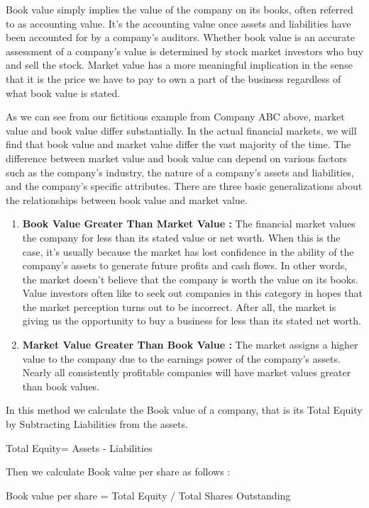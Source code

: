 	Book value simply implies the value of the company on its books, often referred to as accounting value. It's the accounting value once assets and liabilities have been accounted for by a company's auditors. Whether book value is an accurate assessment of a company's value is determined by stock market investors who buy and sell the stock. Market value has a more meaningful implication in the sense that it is the price we have to pay to own a part of the business regardless of what book value is stated.
	
	As we can see from our fictitious example from Company ABC above, market value and book value differ substantially. In the actual financial markets, we will find that book value and market value differ the vast majority of the time. The difference between market value and book value can depend on various factors such as the company's industry, the nature of a company's assets and liabilities, and the company's specific attributes. There are three basic generalizations about the relationships between book value and market value.
\begin{enumerate}
	\item \textbf{Book Value Greater Than Market Value :}  The financial market values the company for less than its stated value or net worth. When this is the case, it's usually because the market has lost confidence in the ability of the company's assets to generate future profits and cash flows. In other words, the market doesn't believe that the company is worth the value on its books. Value investors often like to seek out companies in this category in hopes that the market perception turns out to be incorrect. After all, the market is giving us the opportunity to buy a business for less than its stated net worth.

	\item \textbf{Market Value Greater Than Book Value :}  The market assigns a higher value to the company due to the earnings power of the company's assets. Nearly all consistently profitable companies will have market values greater than book values.
\end{enumerate}
In this method we calculate the Book value of a company, that is its Total Equity by Subtracting Liabilities from the assets.

Total Equity= Assets - Liabilities
 
Then we calculate Book value per share as follows :

Book value per share = Total Equity / Total Shares Outstanding

